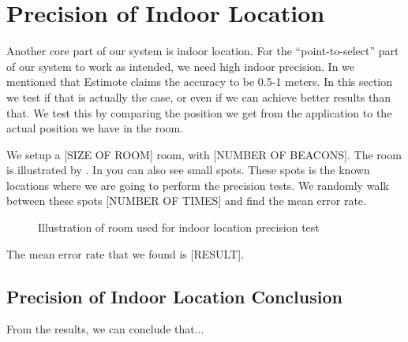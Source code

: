\section{Precision of Indoor Location}\label{sec:estimoteprecision}
Another core part of our system is indoor location. 
For the ``point-to-select'' part of our system to work as intended, we need high indoor precision. 
In  we mentioned that Estimote claims the accuracy to be \num{0.5}-\num{1} meters.
In this section we test if that is actually the case, or even if we can achieve better results than that. 
We test this by comparing the position we get from the application to the actual position we have in the room. 

We setup a [SIZE OF ROOM] room, with [NUMBER OF BEACONS]. 
The room is illustrated by . 
In  you can also see small spots. 
These spots is the known locations where we are going to perform the precision tests. 
We randomly walk between these spots [NUMBER OF TIMES] and find the mean error rate.
\begin{figure}[!htb]
    \centering
    \caption{Illustration of room used for indoor location precision test}
    \label{fig:precisiontest}
\end{figure}

The mean error rate that we found is [RESULT]. 

\subsection{Precision of Indoor Location Conclusion}
From the results, we can conclude that... 

